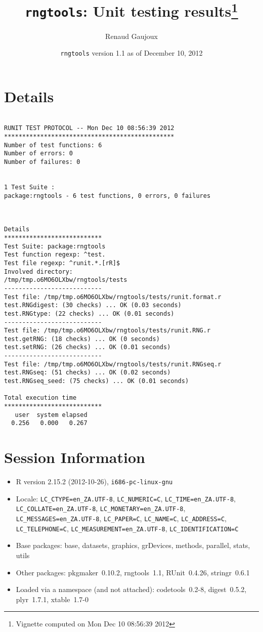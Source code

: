 \documentclass[10pt]{article}
\author{Renaud Gaujoux}
\title{\texttt{rngtools}: Unit testing results\footnote{Vignette computed  on Mon Dec 10 08:56:39 2012}}
\date{\texttt{rngtools} version 1.1 as of December 10, 2012}
\begin{document}
\maketitle

\section{Details}
\begin{verbatim}

RUNIT TEST PROTOCOL -- Mon Dec 10 08:56:39 2012 
*********************************************** 
Number of test functions: 6 
Number of errors: 0 
Number of failures: 0 

 
1 Test Suite : 
package:rngtools - 6 test functions, 0 errors, 0 failures



Details 
*************************** 
Test Suite: package:rngtools 
Test function regexp: ^test. 
Test file regexp: ^runit.*.[rR]$ 
Involved directory: 
/tmp/tmp.o6MO6OLXbw/rngtools/tests 
--------------------------- 
Test file: /tmp/tmp.o6MO6OLXbw/rngtools/tests/runit.format.r 
test.RNGdigest: (30 checks) ... OK (0.03 seconds)
test.RNGtype: (22 checks) ... OK (0.01 seconds)
--------------------------- 
Test file: /tmp/tmp.o6MO6OLXbw/rngtools/tests/runit.RNG.r 
test.getRNG: (18 checks) ... OK (0 seconds)
test.setRNG: (26 checks) ... OK (0.01 seconds)
--------------------------- 
Test file: /tmp/tmp.o6MO6OLXbw/rngtools/tests/runit.RNGseq.r 
test.RNGseq: (51 checks) ... OK (0.02 seconds)
test.RNGseq_seed: (75 checks) ... OK (0.01 seconds)

Total execution time
***************************
   user  system elapsed 
  0.256   0.000   0.267 

\end{verbatim}

\section*{Session Information}
\begin{itemize}\raggedright
  \item R version 2.15.2 (2012-10-26), \verb|i686-pc-linux-gnu|
  \item Locale: \verb|LC_CTYPE=en_ZA.UTF-8|, \verb|LC_NUMERIC=C|, \verb|LC_TIME=en_ZA.UTF-8|, \verb|LC_COLLATE=en_ZA.UTF-8|, \verb|LC_MONETARY=en_ZA.UTF-8|, \verb|LC_MESSAGES=en_ZA.UTF-8|, \verb|LC_PAPER=C|, \verb|LC_NAME=C|, \verb|LC_ADDRESS=C|, \verb|LC_TELEPHONE=C|, \verb|LC_MEASUREMENT=en_ZA.UTF-8|, \verb|LC_IDENTIFICATION=C|
  \item Base packages: base, datasets, graphics, grDevices, methods,
    parallel, stats, utils
  \item Other packages: pkgmaker~0.10.2, rngtools~1.1, RUnit~0.4.26,
    stringr~0.6.1
  \item Loaded via a namespace (and not attached): codetools~0.2-8,
    digest~0.5.2, plyr~1.7.1, xtable~1.7-0
\end{itemize}
\end{document}
